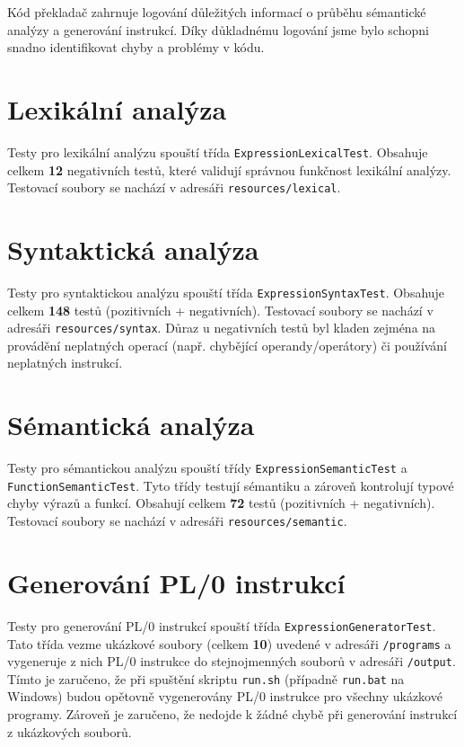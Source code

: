 \documentclass[czech, oth, kiv, he, iso690numb, viewonly]{fasthesis}
\begin{document}
    Kód překladač zahrnuje logování důležitých informací o průběhu sémantické analýzy a generování instrukcí.
    Díky důkladnému logování jsme bylo schopni snadno identifikovat chyby a problémy v kódu.

    \section{Lexikální analýza}

    Testy pro lexikální analýzu spouští třída \texttt{ExpressionLexicalTest}.
    Obsahuje celkem \textbf{12} negativních testů, které validují správnou funkčnost lexikální analýzy.
    Testovací soubory se nachází v adresáři \texttt{resources/lexical}.

    \section{Syntaktická analýza}

    Testy pro syntaktickou analýzu spouští třída \texttt{ExpressionSyntaxTest}.
    Obsahuje celkem \textbf{148} testů (pozitivních + negativních).
    Testovací soubory se nachází v adresáři \texttt{resources/syntax}.
    Důraz u negativních testů byl kladen zejména na provádění neplatných operací (např. chybějící operandy/operátory) či používání neplatných instrukcí.

    \section{Sémantická analýza}

    Testy pro sémantickou analýzu spouští třídy \texttt{ExpressionSemanticTest} a \texttt{FunctionSemanticTest}.
    Tyto třídy testují sémantiku a zároveň kontrolují typové chyby výrazů a funkcí.
    Obsahují celkem \textbf{72} testů (pozitivních + negativních).
    Testovací soubory se nachází v adresáři \texttt{resources/semantic}.

    \section{Generování PL/0 instrukcí}

    Testy pro generování PL/0 instrukcí spouští třída \texttt{ExpressionGeneratorTest}.
    Tato třída vezme ukázkové soubory (celkem \textbf{10}) uvedené v adresáři \texttt{/programs} a vygeneruje z nich PL/0 instrukce do stejnojmenných souborů v adresáři \texttt{/output}.
    Tímto je zaručeno, že při spuštění skriptu \texttt{run.sh} (případně \texttt{run.bat} na Windows) budou opětovně vygenerovány PL/0 instrukce pro všechny ukázkové programy.
    Zároveň je zaručeno, že nedojde k žádné chybě při generování instrukcí z ukázkových souborů.
    
\end{document}
